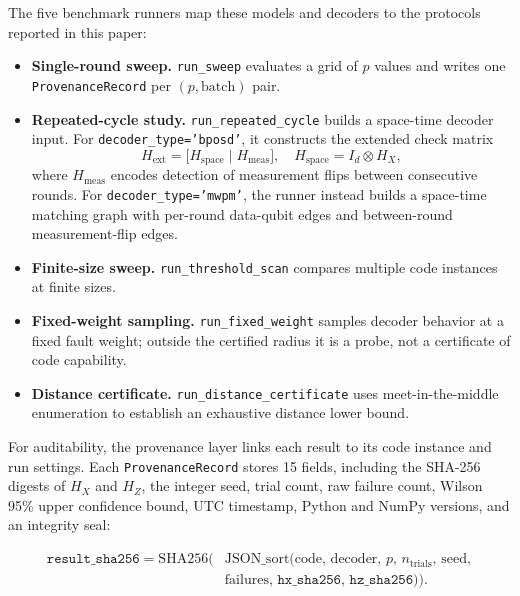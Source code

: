 \documentclass[pdflatex,sn-mathphys-num]{sn-jnl}
\theoremstyle{thmstyleone}
\theoremstyle{thmstyletwo}
\theoremstyle{thmstylethree}
\begin{document}
The five benchmark runners map these models and decoders to the protocols reported in this paper:
\begin{itemize}[leftmargin=1.6em,itemsep=2pt]
  \item \textbf{Single-round sweep.} \texttt{run\_sweep} evaluates a grid of $p$ values and writes one \texttt{ProvenanceRecord} per $(p,\text{batch})$ pair.
  \item \textbf{Repeated-cycle study.} \texttt{run\_repeated\_cycle} builds a space-time decoder input. For \texttt{decoder\_type='bposd'}, it constructs the extended check matrix
\begin{equation}
  H_{\mathrm{ext}}
  = \bigl[H_{\mathrm{space}}\;\big|\;H_{\mathrm{meas}}\bigr],
  \quad H_{\mathrm{space}} = I_d \otimes H_X,
  \label{eq:spacetime}
\end{equation}
where $H_{\mathrm{meas}}$ encodes detection of measurement flips between consecutive rounds. For \texttt{decoder\_type='mwpm'}, the runner instead builds a space-time matching graph with per-round data-qubit edges and between-round measurement-flip edges.
  \item \textbf{Finite-size sweep.} \texttt{run\_threshold\_scan} compares multiple code instances at finite sizes.
  \item \textbf{Fixed-weight sampling.} \texttt{run\_fixed\_weight} samples decoder behavior at a fixed fault weight; outside the certified radius it is a probe, not a certificate of code capability.
  \item \textbf{Distance certificate.} \texttt{run\_distance\_certificate} uses meet-in-the-middle enumeration to establish an exhaustive distance lower bound.
\end{itemize}

For auditability, the provenance layer links each result to its code instance and run settings. Each \texttt{ProvenanceRecord} stores 15 fields, including the SHA-256 digests of $H_X$ and $H_Z$, the integer seed, trial count, raw failure count, Wilson 95\% upper confidence bound, UTC timestamp, Python and NumPy versions, and an integrity seal:

\begin{equation}
\begin{split}
  \texttt{result\_sha256}
  = \mathrm{SHA256}\!\bigl(&
    \mathrm{JSON\_sort}(\mathrm{code},\, \mathrm{decoder},\, p,\,
    n_{\mathrm{trials}},\, \mathrm{seed},\\
    &\mathrm{failures},\,
    \texttt{hx\_sha256},\, \texttt{hz\_sha256})
  \bigr).
\end{split}
  \label{eq:integrity-seal}
\end{equation}
\end{document}
